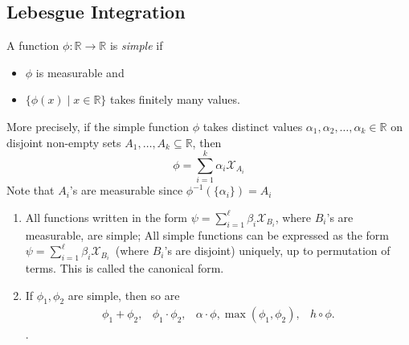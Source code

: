 \subsection{Lebesgue Integration}
\begin{definition}
A function $\phi:\mathbb{R}\to\mathbb{R}$ is \emph{simple} if 
\begin{itemize}
\item
$\phi$ is measurable and
\item
$\{\phi(x)\mid x\in\mathbb{R}\}$ takes finitely many values.
\end{itemize}

More precisely, if the simple function $\phi$ takes distinct values $\alpha_1,\alpha_2,\dots,\alpha_k\in\mathbb{R}$ on disjoint non-empty sets $A_1,\dots,A_k\subseteq\mathbb{R}$, then
\[
\phi = \sum_{i=1}^k\alpha_i\mathcal{X}_{A_i}
\]
Note that $A_i$'s are measurable since $\phi^{-1}(\{\alpha_i\}) = A_i$
\end{definition}
\begin{remark}
\begin{enumerate}
\item
All functions written in the form $\psi = \sum_{i=1}^{\ell}\beta_i\mathcal{X}_{B_i}$, where $B_i$'s are measurable, are simple;
All simple functions can be expressed as the form $\psi = \sum_{i=1}^{\ell}\beta_i\mathcal{X}_{B_i}$~(where $B_i$'s are disjoint) uniquely, up to permutation of terms.
This is called the canonical form.
\item
If $\phi_1,\phi_2$ are simple, then so are
\[
\begin{array}{llll}
\phi_1+\phi_2,
&
\phi_1\cdot\phi_2,
&
\alpha\cdot\phi,
\max(\phi_1,\phi_2),
&
h\circ\phi.
\end{array}
\]
.
\end{enumerate}
\end{remark}

